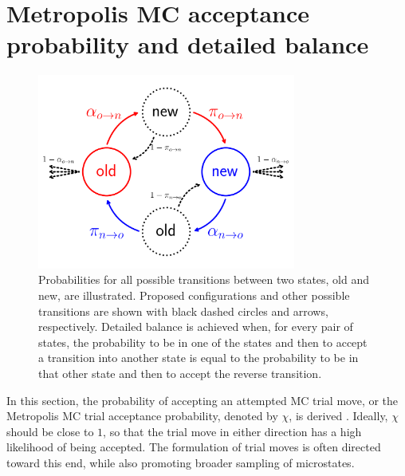 \documentclass[
  9pt,
  bestpractices,
]{livecoms}
\begin{document}
\section{\label{sec:detailed_balance}Metropolis MC acceptance probability and detailed balance}

\begin{figure}
\begin{centering}
\includegraphics[width=8.5cm]{../figures/detailed_balance.png}
\caption{
Probabilities for all possible transitions between two states, old and new, are illustrated.
Proposed configurations and other possible transitions are shown with black dashed circles and arrows, respectively.
Detailed balance is achieved when, for every pair of states, the probability to be in one of the states and then to accept a transition into another state is equal to the probability to be in that other state and then to accept the reverse transition.
}
\label{fig:detailed_balance}
\end{centering}
\end{figure}

In this section, the probability of accepting an attempted MC trial move, or the Metropolis MC trial acceptance probability, denoted by $\chi$, is derived \cite{metropolis_equation_1953, hastings_monte_1970, kofke_monte_1988, allen_computer_1989, frenkel_understanding_2002}.
Ideally, $\chi$ should be close to $1$, so that the trial move in either direction has a high likelihood of being accepted.
The formulation of trial moves is often directed toward this end, while also promoting broader sampling of microstates.
\end{document}

